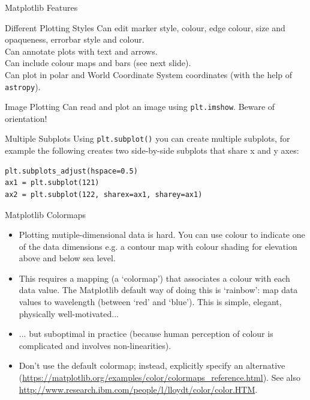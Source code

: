 \documentclass{beamer}
\begin{document}
\begin{frame}[fragile]{Matplotlib Features}
  \fontsize{11pt}{11}\selectfont
  \begin{block}{Different Plotting Styles}
     Can edit marker style, colour, edge colour, size and opaqueness, errorbar style and colour. \\
     Can annotate plots with text and arrows. \\
     Can include colour maps and bars (see next slide). \\
     Can plot in polar and World Coordinate System coordinates (with the help of \texttt{astropy}).
  \end{block}
  \begin{block}{Image Plotting}
     Can read and plot an image using \texttt{plt.imshow}. Beware of orientation!
  \end{block}
  \begin{block}{Multiple Subplots}
     Using \texttt{plt.subplot()} you can create multiple subplots, for example the following creates two side-by-side subplots that share x and y axes:\\
     \begin{lstlisting}
plt.subplots_adjust(hspace=0.5)
ax1 = plt.subplot(121)
ax2 = plt.subplot(122, sharex=ax1, sharey=ax1)
     \end{lstlisting}
  \end{block}
\end{frame}

\begin{frame}{Matplotlib Colormaps}
  \begin{itemize}
    \item Plotting mutiple-dimensional data is hard. You can use colour to indicate one of the data dimensions e.g. a contour map with colour shading for elevation above and below sea level.
    \item This requires a mapping (a `colormap') that associates a colour with each data value. The Matplotlib default way of doing this is `rainbow': map data values to wavelength (between `red' and `blue'). This is simple, elegant, physically well-motivated...
    \item ... but suboptimal in practice (because human perception of colour is complicated and involves non-linearities).
    \item Don't use the default colormap; instead, explicitly specify an alternative (\url{https://matplotlib.org/examples/color/colormaps_reference.html}). See also \url{http://www.research.ibm.com/people/l/lloydt/color/color.HTM}.
  \end{itemize}

\end{frame}
\end{document}

